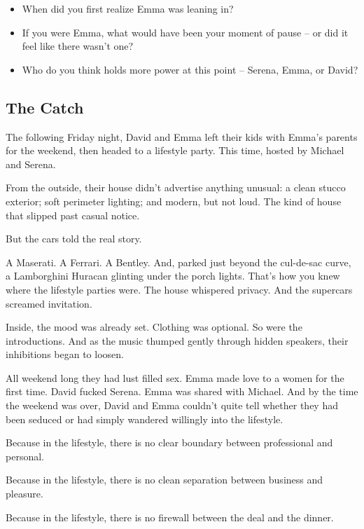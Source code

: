 \begin{itemize}
  \item When did you first realize Emma was leaning in?
  \item If you were Emma, what would have been your moment of pause -- or did it feel like there wasn’t one?
  \item Who do you think holds more power at this point -- Serena, Emma, or David?
\end{itemize}







\subsection{The Catch}

The following Friday night, David and Emma left their kids with Emma's parents for the weekend,
then headed to a lifestyle party. This time, hosted by Michael and Serena.

From the outside, their house didn’t advertise anything unusual: a clean stucco exterior; soft perimeter lighting; and modern, 
but not loud. The kind of house that slipped past casual notice.

But the cars told the real story.

A Maserati. A Ferrari. A Bentley. And, parked just beyond the cul-de-sac curve, a Lamborghini Huracan glinting under the porch 
lights.
That’s how you knew where the lifestyle parties were. The house whispered privacy. And the supercars screamed invitation.

Inside, the mood was already set. Clothing was optional. So were the introductions.
And as the music thumped gently through hidden speakers, their inhibitions began to loosen.

All weekend long they had lust filled sex.  Emma made love to a women for the first time.  David 
fucked Serena.  Emma was shared with Michael.  And by the time the weekend was over, David and 
Emma couldn’t quite tell whether they had been seduced or had simply wandered willingly into the lifestyle.


Because in the lifestyle, there is no clear boundary between professional and personal.  

Because in the lifestyle, there is no clean separation between business and pleasure.  

Because in the lifestyle, there is no firewall between the deal and the dinner.

